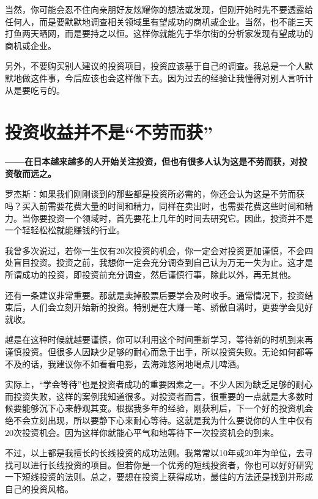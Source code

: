 \documentclass[UTF8,a4paper,zihao=-4,fontset = ubuntu]{ctexart} %
\begin{document}
当然，你可能会忍不住向亲朋好友炫耀你的想法或发现，但刚开始时先不要透露给任何人，而是要默默地调查相关领域里有望成功的商机或企业。当然，也不能三天打鱼两天晒网，而是要持之以恒。这样你就能先于华尔街的分析家发现有望成功的商机或企业。

另外，不要购买别人建议的投资项目，投资应该基于自己的调查。我总是一个人默默地做这件事，今后应该也会这样做下去。因为过去的经验让我懂得对别人言听计从是要吃亏的。

\section{投资收益并不是“不劳而获”}

\textbf{——在日本越来越多的人开始关注投资，但也有很多人认为这是不劳而获，对投资敬而远之。}

罗杰斯：如果我们刚刚谈到的那些都是投资所必需的，你还会认为这是不劳而获吗？买入前需要花费大量的时间和精力，同样在卖出时，也需要花费这些时间和精力。当你要投资一个领域时，首先要花上几年的时间去研究它。因此，投资并不是一个轻轻松松就能赚钱的行业。

我曾多次说过，若你一生仅有20次投资的机会，你一定会对投资更加谨慎，不会四处盲目投资。投资之前，我想你一定会充分调查到自己认为万无一失为止。这才是所谓成功的投资，即投资前充分调查，然后谨慎行事，除此以外，再无其他。

还有一条建议非常重要。那就是卖掉股票后要学会及时收手。通常情况下，投资结束后，人们会立刻开始新的投资。特别是在大赚一笔、骄傲自满时，更要学会见好就收。

越是在这种时候就越要谨慎，你可以利用这个时间重新学习，等待新的时机到来再谨慎投资。但很多人因缺少足够的耐心而急于出手，所以投资失败。无论如何都等不及的话，我建议你不如看看电影，去海滩悠闲地喝点儿啤酒。

实际上，“学会等待”也是投资者成功的重要因素之一。不少人因为缺乏足够的耐心而投资失败，这样的案例我知道很多。对投资者而言，很重要的一点就是大多数时候要能够沉下心来静观其变。根据我多年的经验，刚获利后，下一个好的投资机会绝不会立刻出现，所以要静下心来耐心等待。这就是我为什么要说你的人生中仅有20次投资机会。因为这样你就能心平气和地等待下一次投资机会的到来。

不过，以上都是我擅长的长线投资的成功法则。我常常以10年或20年为单位，去寻找可以进行长线投资的项目。但若你是一个优秀的短线投资者，你也可以好好研究一下短线投资的法则。总之，要想在投资上获得成功，最佳的方法还是找到并形成自己的投资风格。
\end{document}
